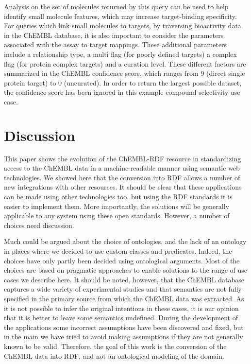 \documentclass[10pt]{bmc_article}
\newenvironment{bmcformat}{\begin{raggedright}\baselineskip20pt\sloppy\setboolean{publ}{false}}{\end{raggedright}\baselineskip20pt\sloppy}
\begin{document}
\begin{bmcformat}
Analysis on the set of molecules returned by this query can be used to help identify small 
molecule features, which may increase target-binding specificity. For queries which link 
small molecules to targets, by traversing bioactivity data in the ChEMBL database, it is 
also important to consider the parameters associated with the assay to target mappings. 
These additional parameters include a relationship type, a multi flag (for poorly defined
targets) a complex flag (for protein complex targets) and a curation level. These different 
factors are summarized in the ChEMBL confidence score, which ranges from 9 (direct single 
protein target) to 0 (uncurated). In order to return the largest possible dataset, the 
confidence score has been ignored in this example compound selectivity use case.

\section*{Discussion}

This paper shows the evolution of the ChEMBL-RDF resource in standardizing access to the
ChEMBL data in a machine-readable manner using semantic web technologies. We showed here
that the conversion into RDF allows a number of new integrations with other resources.
It should be clear that these applications can be made using other technologies too, but
using the RDF standards it is easier to implement them. More importantly, the solutions
will be generally applicable to any system using these open standards. However, a number
of choices need discussion. 

Much could be argued about the choice of ontologies, and the lack of an
ontology in places where we decided to use custom classes and predicates. Indeed, the
choices have only partly been decided using ontological arguments. Most of the choices are based
on pragmatic approaches to enable solutions to the range of use cases we describe here. It should be noted,
however, that the ChEMBL database captures a wide variety of experimental studies
and that semantics are not fully specified in the primary source from which the ChEMBL data was
extracted. As it is not possible to infer the original intentions in these cases, 
it is our opinion that it is better to leave some semantics undefined. During the 
development of the applications some incorrect assumptions have been discovered and
fixed, but in the main we have tried to avoid making assumptions if they are not generally known to be valid. 
Therefore, the goal of this work is the conversion of the ChEMBL data into
RDF, and not an ontological modeling of the domain.


\end{bmcformat}
\end{document}
